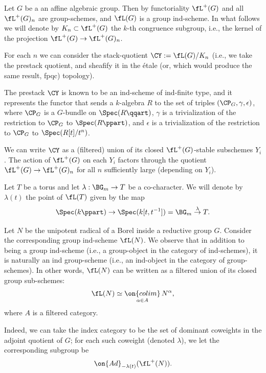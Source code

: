 \documentclass[9pt]{amsart}
\theoremstyle{definition}
\theoremstyle{remark}
\numberwithin{equation}{section}
\begin{document}
\sssec{}

Let $G$ be a an affine algebraic group. Then by functoriality $\fL^+(G)$ and all $\fL^+(G)_n$
are group-schemes, and $\fL(G)$ is a group ind-scheme. In what follows we will denote by $K_n\subset \fL^+(G)$
the $k$-th congruence subgroup, i.e., the kernel of the projection $\fL^+(G)\to \fL^+(G)_n$. 

\medskip

For each $n$ we can consider the stack-quotient $\CY:=\fL(G)/K_n$ (i.e., we take the prestack 
quotient, and sheafify it in the \'etale (or, which would produce the same result, fpqc) topology). 

\medskip

The prestack $\CY$ is known to be an ind-scheme of ind-finite type, and it represents the functor that sends 
a $k$-algebra $R$ to the set of triples $(\CP_G,\gamma,\epsilon)$, where $\CP_G$ is a $G$-bundle 
on $\Spec(R\qqart)$, $\gamma$ is a trivialization of the restriction to $\CP_G$ to $\Spec(R\ppart)$,
and $\epsilon$ is a trivialization of the restriction to $\CP_G$ to $\Spec(R[t]/t^n)$. 

\medskip

We can write $\CY$ as a (filtered) union of its closed $\fL^+(G)$-stable subschemes $Y_i$. The action of 
$\fL^+(G)$ on each $Y_i$ factors through the quotient $\fL^+(G)\to \fL^+(G)_n$ for all $n$ sufficiently large
(depending on $Y_i$). 

\sssec{}

Let $T$ be a torus and let $\lambda:\BG_m\to T$ be a co-character. We will denote by $\lambda(t)$ the point of
$\fL(T)$ given by the map
$$\Spec(k\ppart)\to \Spec(k[t,t^{-1}])=\BG_m\overset{\lambda}\to T.$$

\sssec{}

Let $N$ be the unipotent radical of a Borel inside a reductive group $G$. Consider the corresponding group ind-scheme
$\fL(N)$. We observe that in addition to being a group ind-scheme (i.e., a group-object in the category of ind-schemes),
it is naturally an ind group-scheme (i.e., an ind-object in the category of group-schemes). In other words, $\fL(N)$
can be written as a filtered union of its closed group sub-schemes: 
\begin{equation} \label{e:loop N as colim}
\fL(N)\simeq \underset{\alpha\in A}{\on{colim}}\, N^\alpha,
\end{equation} 
where $A$ is a filtered category.

\medskip

Indeed, we can take the index category to be the set of dominant coweights in the adjoint quotient of $G$; for each
such coweight (denoted $\lambda$), we let the corresponding subgroup be
$$\on{Ad}_{-\lambda(t)}(\fL^+(N)).$$
\end{document}
